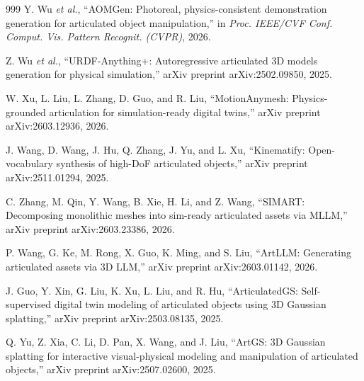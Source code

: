 \documentclass[12pt,a4paper,oneside]{report}
\begin{document}
\begin{thebibliography}{999}
Y. Wu \textit{et al.}, ``{AOMGen}: Photoreal, physics-consistent demonstration generation for articulated object manipulation,'' in \textit{Proc. IEEE/CVF Conf. Comput. Vis. Pattern Recognit. (CVPR)}, 2026.




Z. Wu \textit{et al.}, ``{URDF-Anything+}: Autoregressive articulated {3D} models generation for physical simulation,'' arXiv preprint arXiv:2502.09850, 2025.




W. Xu, L. Liu, L. Zhang, D. Guo, and R. Liu, ``{MotionAnymesh}: Physics-grounded articulation for simulation-ready digital twins,'' arXiv preprint arXiv:2603.12936, 2026.




J. Wang, D. Wang, J. Hu, Q. Zhang, J. Yu, and L. Xu, ``Kinematify: Open-vocabulary synthesis of high-{DoF} articulated objects,'' arXiv preprint arXiv:2511.01294, 2025.




C. Zhang, M. Qin, Y. Wang, B. Xie, H. Li, and Z. Wang, ``{SIMART}: Decomposing monolithic meshes into sim-ready articulated assets via {MLLM},'' arXiv preprint arXiv:2603.23386, 2026.




P. Wang, G. Ke, M. Rong, X. Guo, K. Ming, and S. Liu, ``ArtLLM: Generating articulated assets via {3D} LLM,'' arXiv preprint arXiv:2603.01142, 2026.




J. Guo, Y. Xin, G. Liu, K. Xu, L. Liu, and R. Hu, ``{ArticulatedGS}: Self-supervised digital twin modeling of articulated objects using {3D} Gaussian splatting,'' arXiv preprint arXiv:2503.08135, 2025.




Q. Yu, Z. Xia, C. Li, D. Pan, X. Wang, and J. Liu, ``{ArtGS}: {3D} Gaussian splatting for interactive visual-physical modeling and manipulation of articulated objects,'' arXiv preprint arXiv:2507.02600, 2025.





\end{thebibliography}
\end{document}
